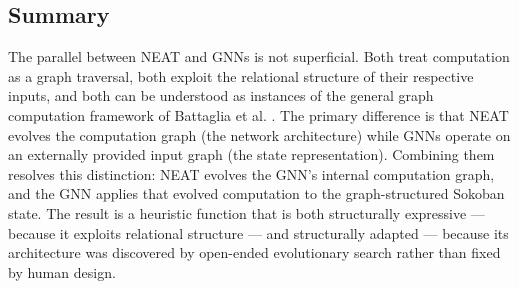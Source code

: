 \subsection{Summary}

The parallel between NEAT and GNNs is not superficial. Both treat computation as a graph traversal, both exploit the relational structure of their respective inputs, and both can be understood as instances of the general graph computation framework of Battaglia et al. \cite{battaglia2018relational}. The primary difference is that NEAT evolves the computation graph (the network architecture) while GNNs operate on an externally provided input graph (the state representation). Combining them resolves this distinction: NEAT evolves the GNN's internal computation graph, and the GNN applies that evolved computation to the graph-structured Sokoban state. The result is a heuristic function that is both structurally expressive --- because it exploits relational structure --- and structurally adapted --- because its architecture was discovered by open-ended evolutionary search rather than fixed by human design.
